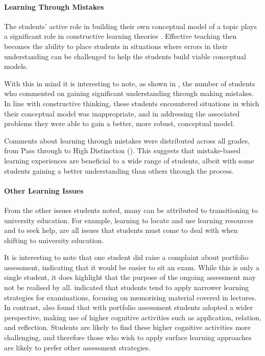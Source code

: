 
\paragraph{Learning Through Mistakes} %
\label{ssub:learning_through_mistakes}

The students' active role in building their own conceptual model of a topic plays a significant role in constructive learning theories \cite{Glasersfeld:1989}. Effective teaching then becomes the ability to place students in situations where errors in their understanding can be challenged to help the students build viable conceptual models. 

With this in mind it is interesting to note, as shown in , the number of students who commented on gaining significant understanding through making mistakes. In line with constructive thinking, these students encountered situations in which their conceptual model was inappropriate, and in addressing the associated problems they were able to gain a better, more robust, conceptual model.

Comments about learning through mistakes were distributed across all grades, from Pass through to High Distinction (). This suggests that mistake-based learning experiences are beneficial to a wide range of students, albeit with some students gaining a better understanding than others through the process. 



\paragraph{Other Learning Issues} %
\label{ssub:other_learning_issues}

From the other issues students noted, many can be attributed to transitioning to university education. For example, learning to locate and use learning resources and to seek help, are all issues that students must come to deal with when shifting to university education.

It is interesting to note that one student did raise a complaint about portfolio assessment, indicating that it would be easier to sit an exam. While this is only a single student, it does highlight that the purpose of the ongoing assessment may not be realised by all. \citet{Tang:1999} indicated that students tend to apply narrower learning strategies for examinations, focusing on memorising material covered in lectures. In contrast, \citet{Tang:1999} also found that with portfolio assessment students adopted a wider perspective, making use of higher cognitive activities such as application, relation, and reflection. Students are likely to find these higher cognitive activities more challenging, and therefore those who wish to apply surface learning approaches are likely to prefer other assessment strategies.


